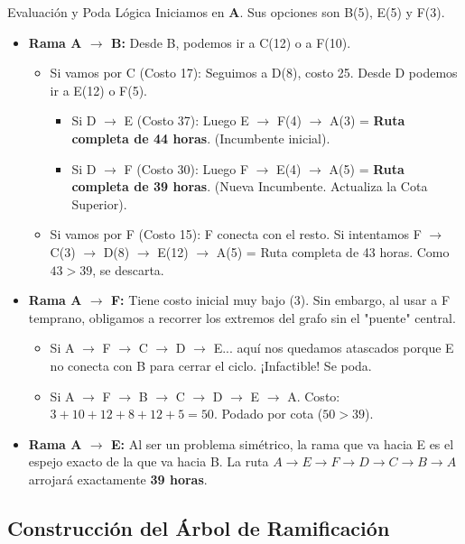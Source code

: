 \documentclass[10pt,a4paper]{article}
\begin{document}
\begin{nota}{Evaluación y Poda Lógica}
Iniciamos en \textbf{A}. Sus opciones son B(5), E(5) y F(3).
\begin{itemize}
    \item \textbf{Rama A $\to$ B:} Desde B, podemos ir a C(12) o a F(10). 
        \begin{itemize}
            \item Si vamos por C (Costo 17): Seguimos a D(8), costo 25. Desde D podemos ir a E(12) o F(5).
            \begin{itemize}
                \item Si D $\to$ E (Costo 37): Luego E $\to$ F(4) $\to$ A(3) = \textbf{Ruta completa de 44 horas}. (Incumbente inicial).
                \item Si D $\to$ F (Costo 30): Luego F $\to$ E(4) $\to$ A(5) = \textbf{Ruta completa de 39 horas}. (Nueva Incumbente. Actualiza la Cota Superior).
            \end{itemize}
            \item Si vamos por F (Costo 15): F conecta con el resto. Si intentamos F $\to$ C(3) $\to$ D(8) $\to$ E(12) $\to$ A(5) = Ruta completa de 43 horas. Como $43 > 39$, se descarta.
        \end{itemize}
    
    \item \textbf{Rama A $\to$ F:} Tiene costo inicial muy bajo (3). Sin embargo, al usar a F temprano, obligamos a recorrer los extremos del grafo sin el "puente" central. 
        \begin{itemize}
            \item Si A $\to$ F $\to$ C $\to$ D $\to$ E... aquí nos quedamos atascados porque E no conecta con B para cerrar el ciclo. ¡Infactible! Se poda.
            \item Si A $\to$ F $\to$ B $\to$ C $\to$ D $\to$ E $\to$ A. Costo: $3+10+12+8+12+5 = 50$. Podado por cota ($50 > 39$).
        \end{itemize}
        
    \item \textbf{Rama A $\to$ E:} Al ser un problema simétrico, la rama que va hacia E es el espejo exacto de la que va hacia B. La ruta $A \to E \to F \to D \to C \to B \to A$ arrojará exactamente \textbf{39 horas}.
\end{itemize}
\end{nota}

\newpage
\subsection{Construcción del Árbol de Ramificación}
\end{document}
